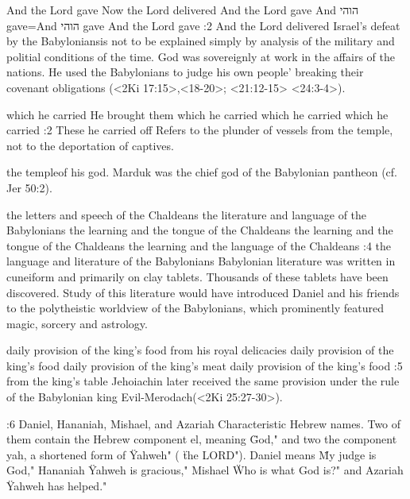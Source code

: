     {And the Lord gave} %
    {Now the Lord delivered} %
    {And the Lord gave} %
    {And      הוהי       gave}={And {\HebrewFont   הוהי}  gave} %
    {And the Lord gave} %
:2 {And the Lord delivered} Israel's defeat by the Babyloniansis 
not to be explained simply by analysis of the military and politial
conditions of the time. God was sovereignly at work in the affairs of 
the nations. He used the Babylonians to judge his own people' 
breaking their covenant obligations (<2Ki 17:15>,<18-20>; <21:12-15> 
<24:3-4>).

    {which he carried} %
    {He brought them} %
    {which he carried} %
    {which he carried} %
    {which he carried} %
:2 {These he carried off} Refers to the plunder of vessels 
from the temple, not to the deportation of captives. 


the templeof 
his god. Marduk was the chief god of the Babylonian pantheon (cf. Jer 50:2).

    {the letters and speech of the Chaldeans} %
    {the literature and language of the Babylonians} %
    {the learning and the tongue of the Chaldeans} %
    {the learning and the tongue of the Chaldeans} %
    {the learning and the language of the Chaldeans} %
:4 {the language and literature of the Babylonians} Babylonian literature was written in
cuneiform and primarily on clay tablets. Thousands of these tablets have been discovered. Study of 
this literature would have introduced Daniel and his friends to the 
polytheistic worldview of the Babylonians, which prominently featured magic, sorcery and astrology. 


    {daily provision of the king's food} %
    {from his royal delicacies} %
    {daily provision of the king's food} %
    {daily provision of the king's meat} %
    {daily provision of the king's food} %
:5 {from the king's table} Jehoiachin later received the same 
provision under the rule of the Babylonian king Evil-Merodach(<2Ki 25:27-30>).

:6 {Daniel, Hananiah, Mishael, and Azariah} Characteristic Hebrew names. Two of them contain
the Hebrew component el,  meaning \"God," and two the component yah, a shortened form of 
 \"Yahweh" ( \"the LORD"). Daniel means  \"My judge is God," Hananiah  \"Yahweh is gracious,"
Mishael  \"Who is what God is?" and Azariah  \"Yahweh has helped."

